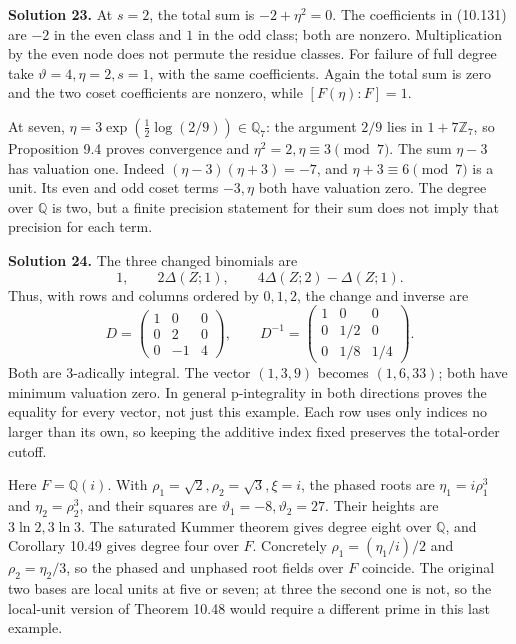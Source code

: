 \documentclass[
  11pt,
  a4paper,
]{article}
\begin{document}
\textbf{Solution 23.} At \(s=2\), the total sum is \(-2+\eta^2=0\). The
coefficients in (10.131) are \(-2\) in the even class and \(1\) in the
odd class; both are nonzero. Multiplication by the even node does not
permute the residue classes. For failure of full degree take
\(\vartheta=4,\eta=2,s=1\), with the same coefficients. Again the total
sum is zero and the two coset coefficients are nonzero, while
\([F(\eta):F]=1\).

At seven, \(\eta=3\exp(\tfrac12\log(2/9))\in\mathbb Q_7\): the argument
\(2/9\) lies in \(1+7\mathbb Z_7\), so Proposition 9.4 proves
convergence and \(\eta^2=2,\eta\equiv3\pmod7\). The sum \(\eta-3\) has
valuation one. Indeed \((\eta-3)(\eta+3)=-7\), and
\(\eta+3\equiv6\pmod7\) is a unit. Its even and odd coset terms
\(-3,\eta\) both have valuation zero. The degree over \(\mathbb Q\) is
two, but a finite precision statement for their sum does not imply that
precision for each term.

\textbf{Solution 24.} The three changed binomials are \[
1,\qquad 2\Delta(Z;1),\qquad
4\Delta(Z;2)-\Delta(Z;1).
\] Thus, with rows and columns ordered by \(0,1,2\), the change and
inverse are \[
D=\begin{pmatrix}1&0&0\\0&2&0\\0&-1&4\end{pmatrix},
\qquad
D^{-1}=\begin{pmatrix}1&0&0\\0&1/2&0\\0&1/8&1/4\end{pmatrix}.
\] Both are 3-adically integral. The vector \((1,3,9)\) becomes
\((1,6,33)\); both have minimum valuation zero. In general p-integrality
in both directions proves the equality for every vector, not just this
example. Each row uses only indices no larger than its own, so keeping
the additive index fixed preserves the total-order cutoff.

Here \(F=\mathbb Q(i)\). With \(\rho_1=\sqrt2,\rho_2=\sqrt3,\xi=i\), the
phased roots are \(\eta_1=i\rho_1^3\) and \(\eta_2=\rho_2^3\), and their
squares are \(\vartheta_1=-8,\vartheta_2=27\). Their heights are
\(3\ln2,3\ln3\). The saturated Kummer theorem gives degree eight over
\(\mathbb Q\), and Corollary 10.49 gives degree four over \(F\).
Concretely \(\rho_1=(\eta_1/i)/2\) and \(\rho_2=\eta_2/3\), so the
phased and unphased root fields over \(F\) coincide. The original two
bases are local units at five or seven; at three the second one is not,
so the local-unit version of Theorem 10.48 would require a different
prime in this last example.
\end{document}
